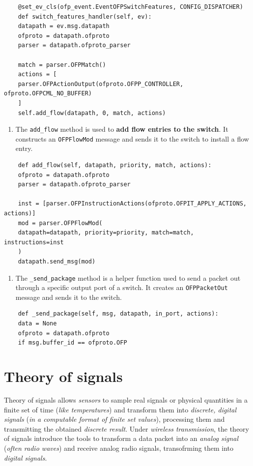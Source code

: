 \documentclass[10pt,a4paper]{report}
\theoremstyle{definition}
\begin{document}
\begin{lstlisting}
	@set_ev_cls(ofp_event.EventOFPSwitchFeatures, CONFIG_DISPATCHER)
	def switch_features_handler(self, ev):
	datapath = ev.msg.datapath
	ofproto = datapath.ofproto
	parser = datapath.ofproto_parser
	
	match = parser.OFPMatch()
	actions = [
	parser.OFPActionOutput(ofproto.OFPP_CONTROLLER, ofproto.OFPCML_NO_BUFFER)
	]
	self.add_flow(datapath, 0, match, actions)
\end{lstlisting}
\begin{enumerate}
	\item 
	The \texttt{add\_flow} method is used to \textbf{add flow entries to the switch}. It constructs an \texttt{OFPFlowMod} message and sends it to the switch to install a flow entry.
\end{enumerate}
\begin{lstlisting}
	def add_flow(self, datapath, priority, match, actions):
	ofproto = datapath.ofproto
	parser = datapath.ofproto_parser
	
	inst = [parser.OFPInstructionActions(ofproto.OFPIT_APPLY_ACTIONS, actions)]
	mod = parser.OFPFlowMod(
	datapath=datapath, priority=priority, match=match, instructions=inst
	)
	datapath.send_msg(mod)
\end{lstlisting}
\begin{enumerate}
	\item 
	The \texttt{\_send\_package} method is a helper function used to send a packet out through a specific output port of a switch. It creates an \texttt{OFPPacketOut} message and sends it to the switch.
\end{enumerate}
\begin{lstlisting}
	def _send_package(self, msg, datapath, in_port, actions):
	data = None
	ofproto = datapath.ofproto
	if msg.buffer_id == ofproto.OFP
\end{lstlisting}


\chapter{Theory of signals}\label{sec:theory-of-signals}
Theory of signals allows \textit{sensors} to sample real signals or physical quantities in a finite set of time (\textit{like temperatures}) and transform them into \textit{discrete, digital signals} (\textit{in a computable format of finite set values}), processing them and transmitting the obtained \textit{discrete result}.
Under \textit{wireless transmission}, the theory of signals introduce the tools to transform a data packet into an \textit{analog signal} (\textit{often radio waves}) and receive analog radio signals, transofrming them into \textit{digital signals}.
\end{document}

